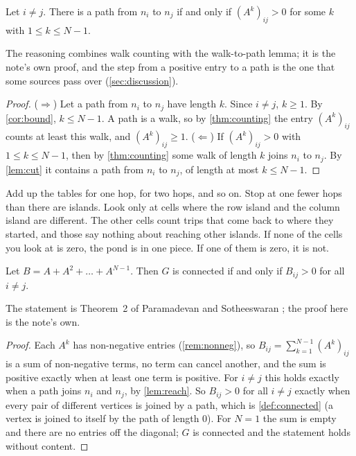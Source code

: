 \begin{lemma}\label{lem:reach}
Let $i\ne j$. There is a path from $n_i$ to $n_j$ if and only if
$(A^k)_{ij}>0$ for some $k$ with $1\le k\le N-1$.
\end{lemma}
The reasoning combines walk counting with the walk-to-path lemma; it is the
note's own proof, and the step from a positive entry to a path is the one
that some sources pass over (\cref{sec:discussion}).
\begin{proof}
($\Rightarrow$) Let a path from $n_i$ to $n_j$ have length $k$. Since
$i\ne j$, $k\ge 1$. By \cref{cor:bound}, $k\le N-1$. A path is a walk, so by
\cref{thm:counting} the entry $(A^k)_{ij}$ counts at least this walk, and
$(A^k)_{ij}\ge 1$.
($\Leftarrow$) If $(A^k)_{ij}>0$ with $1\le k\le N-1$, then by
\cref{thm:counting} some walk of length $k$ joins $n_i$ to $n_j$. By
\cref{lem:cut} it contains a path from $n_i$ to $n_j$, of length at most
$k\le N-1$.
\end{proof}

\plainwords{} Add up the tables for one hop, for two hops, and so on. Stop at
one fewer hops than there are islands. Look only at cells where the row island
and the column island are different. The other cells count trips that come
back to where they started, and those say nothing about reaching other
islands. If none of the cells you look at is zero, the pond is in one
piece. If one of them is zero, it is not.

\begin{theorem}\label{thm:sum}
Let $B=A+A^2+\dots+A^{N-1}$. Then $G$ is connected if and only if
$B_{ij}>0$ for all $i\ne j$.
\end{theorem}
The statement is Theorem~2 of Paramadevan and Sotheeswaran
\cite[p.~17]{paramadevan2021adjacency}; the proof here is the note's own.
\begin{proof}
Each $A^k$ has non-negative entries (\cref{rem:nonneg}), so
$B_{ij}=\sum_{k=1}^{N-1}(A^k)_{ij}$ is a sum of non-negative terms, no term can
cancel another, and the sum is positive exactly when at least one term is
positive. For $i\ne j$ this holds exactly when a path joins $n_i$
and $n_j$, by \cref{lem:reach}. So $B_{ij}>0$ for all $i\ne j$ exactly when
every pair of different vertices is joined by a path, which is
\cref{def:connected} (a vertex is joined to itself by the path of length
$0$). For $N=1$ the sum is empty and there are no entries off the
diagonal; $G$ is connected and the statement holds without content.
\end{proof}

